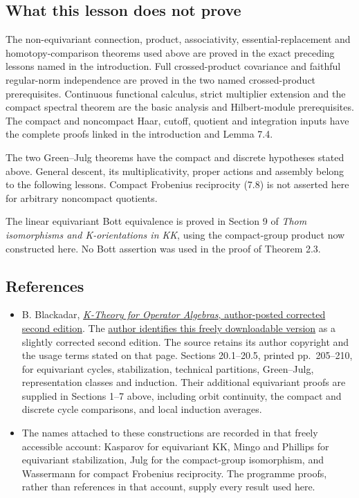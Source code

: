 \documentclass[
  11pt,
]{article}
\begin{document}
\subsection{What this lesson does not
prove}\label{what-this-lesson-does-not-prove}

The non-equivariant connection, product, associativity,
essential-replacement and homotopy-comparison theorems used above are
proved in the exact preceding lessons named in the introduction. Full
crossed-product covariance and faithful regular-norm independence are
proved in the two named crossed-product prerequisites. Continuous
functional calculus, strict multiplier extension and the compact
spectral theorem are the basic analysis and Hilbert-module
prerequisites. The compact and noncompact Haar, cutoff, quotient and
integration inputs have the complete proofs linked in the introduction
and Lemma 7.4.

The two Green--Julg theorems have the compact and discrete hypotheses
stated above. General descent, its multiplicativity, proper actions and
assembly belong to the following lessons. Compact Frobenius reciprocity
(7.8) is not asserted here for arbitrary noncompact quotients.

The linear equivariant Bott equivalence is proved in Section 9 of
\emph{Thom isomorphisms and K-orientations in KK}, using the
compact-group product now constructed here. No Bott assertion was used
in the proof of Theorem 2.3.

\subsection{References}\label{references}

\begin{itemize}
\item
  B. Blackadar,
  \href{https://www.bruceblackadar.com/Mathematics/book6.pdf}{\emph{K-Theory
  for Operator Algebras}, author-posted corrected second edition}. The
  \href{https://www.bruceblackadar.com/mathpubs.html}{author identifies
  this freely downloadable version} as a slightly corrected second
  edition. The source retains its author copyright and the usage terms
  stated on that page. Sections 20.1--20.5, printed pp.~205--210, for
  equivariant cycles, stabilization, technical partitions, Green--Julg,
  representation classes and induction. Their additional equivariant
  proofs are supplied in Sections 1--7 above, including orbit
  continuity, the compact and discrete cycle comparisons, and local
  induction averages.
\item
  The names attached to these constructions are recorded in that freely
  accessible account: Kasparov for equivariant KK, Mingo and Phillips
  for equivariant stabilization, Julg for the compact-group isomorphism,
  and Wassermann for compact Frobenius reciprocity. The programme
  proofs, rather than references in that account, supply every result
  used here.
\end{itemize}
\end{document}
